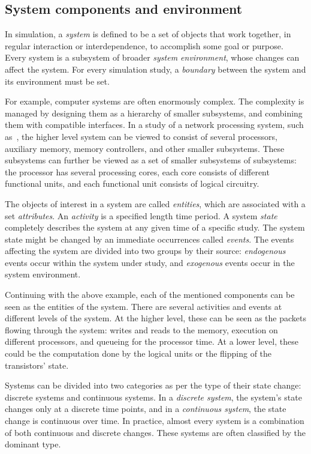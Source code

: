 \subsection{System components and environment}
\label{sec:syst-comp-envir}

In simulation, a \emph{system} is defined to be a set of objects that work together, in regular interaction or interdependence, to accomplish some goal or purpose. Every system is a subsystem of broader \emph{system environment}, whose changes can affect the system. For every simulation study, a \emph{boundary} between the system and its environment must be set.~\cite{Banks:2010:DES}

For example, computer systems are often enormously complex. The complexity is managed by designing them as a hierarchy of smaller subsystems, and combining them with compatible interfaces. In a study of a network processing system, such as~\cite{cavium OCTEON}, the higher level system can be viewed to consist of several processors, auxiliary memory, memory controllers, and other smaller subsystems. These subsystems can further be viewed as a set of smaller subsystems of subsystems: the processor has several processing cores, each core consists of different functional units, and each functional unit consists of logical circuitry.~\cite{Banks:2010:DES}

The objects of interest in a system are called \emph{entities}, which are associated with a set \emph{attributes}. An \emph{activity} is a specified length time period. A system \emph{state} completely describes the system at any given time of a specific study. The system state might be changed by an immediate occurrences called \emph{events}. The events affecting the system are divided into two groups by their source: \emph{endogenous} events occur within the system under study, and \emph{exogenous} events occur in the system environment.~\cite{Banks:2010:DES}

Continuing with the above example, each of the mentioned components can be seen as the entities of the system. There are several activities and events at different levels of the system. At the higher level, these can be seen as the packets flowing through the system: writes and reads to the memory, execution on different processors, and queueing for the processor time. At a lower level, these could be the computation done by the logical units or the flipping of the transistors' state.

Systems can be divided into two categories as per the type of their state change: discrete systems and continuous systems. In a \emph{discrete system}, the system's state changes only at a discrete time points, and in a \emph{continuous system}, the state change is continuous over time. In practice, almost every system is a combination of both continuous and discrete changes. These systems are often classified by the dominant type.~\cite{Banks:2010:DES}

